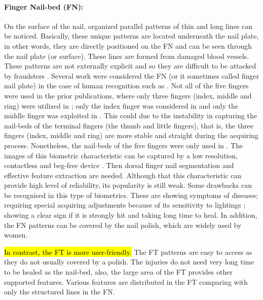 \documentclass[review]{elsarticle}
\begin{document}
	\paragraph{\textbf{Finger Nail-bed (FN):}} On the surface of the nail, organized parallel patterns of thin and long lines can be noticed. Basically, these unique patterns are located underneath the nail plate, in other words, they are directly positioned on the FN and can be seen through the nail plate (or surface). These lines are formed from damaged blood vessels. These patterns are not externally explicit and so they are difficult to be attacked by fraudsters \cite{goudelis2008emerging}. Several work were considered the FN (or it sometimes called finger nail plate) in the case of human recognition such as \cite{garg2012biometric,garg2013unified,varadegraphical,easwaramoorthy2016biometric,raja9investigations,kumar2014biometric,garg2014finger,premakumari2016multimodal}. Not all of the five fingers were used in the prior publications, where only three fingers (index, middle and ring) were utilized in \cite{garg2012biometric,varadegraphical,garg2013unified,kumar2014biometric,garg2014finger}; only the index finger was considered in \cite{easwaramoorthy2016biometric,topping1998method} and only the middle finger was exploited in \cite{premakumari2016multimodal}. This could due to the instability in capturing the nail-beds of the terminal fingers (the thumb and little fingers), that is, the three fingers (index, middle and ring) are more stable and straight during the acquiring process. Nonetheless, the nail-beds of the five fingers were only used in \cite{raja9investigations}. The images of this biometric characteristic can be captured by a low resolution, contactless and beg-free device \cite{kumar2014biometric}. Then dorsal finger nail segmentation \cite{premakumari2016multimodal,garg2012biometric} and effective feature extraction are needed. Although that this characteristic can provide high level of reliability, its popularity is still weak. Some drawbacks can be recognised in this type of biometrics. These are showing symptoms of diseases; requiring special acquiring adjustments because of its sensitivity to lightings \cite{devi2015study}; showing a clear sign if it is strongly hit and taking long time to heal. In addition, the FN patterns can be covered by the nail polish, which are widely used by women.
	
	\hl{In contrast, the FT is more user-friendly.} The FT patterns are easy to access as they do not usually covered by a polish. The injuries do not need very long time to be healed as the nail-bed, also, the large area of the FT provides other supported features. Various features are distributed in the FT comparing with only the structured lines in the FN.
\end{document}
